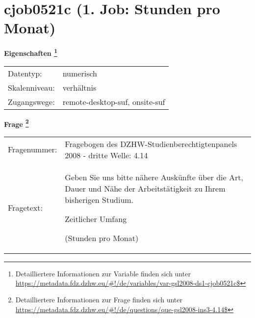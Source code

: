 
    \setcounter{footnote}{0}

    \vspace*{-1.8cm}
	\section{cjob0521c (1. Job: Stunden pro Monat)}
	\label{section:cjob0521c}



    \vspace*{0.5cm}
    \noindent\textbf{Eigenschaften
	\footnote{Detailliertere Informationen zur Variable finden sich unter
		\url{https://metadata.fdz.dzhw.eu/\#!/de/variables/var-gsl2008-ds1-cjob0521c$}}}\\
	\begin{tabularx}{\hsize}{@{}lX}
	Datentyp: & numerisch \\
	Skalenniveau: & verhältnis \\
	Zugangswege: &
	  remote-desktop-suf, 
	  onsite-suf
 \\
    \end{tabularx}



				\vspace*{0.5cm}
                \noindent\textbf{Frage
	                \footnote{Detailliertere Informationen zur Frage finden sich unter
		              \url{https://metadata.fdz.dzhw.eu/\#!/de/questions/que-gsl2008-ins3-4.14$}}}\\
				\begin{tabularx}{\hsize}{@{}lX}
					Fragenummer: &
					  Fragebogen des DZHW-Studienberechtigtenpanels 2008 - dritte Welle:
					  4.14
 \\
					Fragetext: & Geben Sie uns bitte nähere Auskünfte über die Art, Dauer und Nähe der Arbeitstätigkeit zu Ihrem bisherigen Studium.\par  Zeitlicher Umfang\par  (Stunden pro Monat) \\
				\end{tabularx}





